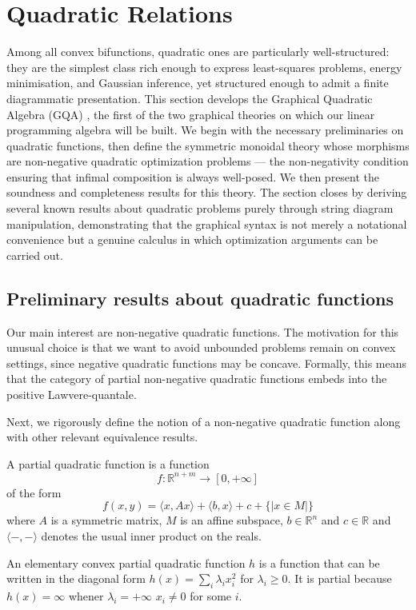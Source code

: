 \chapter{Quadratic Relations}

Among all convex bifunctions, quadratic ones are particularly well-structured:
they are the simplest class rich enough to express least-squares problems, energy minimisation, and Gaussian inference, yet structured enough to admit a finite diagrammatic presentation. This section develops the Graphical Quadratic Algebra (GQA) \cite{stein2024gqa}, the first of the two graphical theories on which our linear programming algebra will be built.
We begin with the necessary preliminaries on quadratic functions, then define the symmetric monoidal theory whose morphisms are non-negative quadratic optimization problems — the non-negativity condition ensuring that infimal composition is always well-posed. We then present the soundness and completeness results for this theory. The section closes by deriving several known results about quadratic problems purely through string diagram manipulation, demonstrating that the graphical syntax is not merely a notational convenience but a genuine calculus in which optimization arguments can be carried out.
\section{Preliminary results about quadratic functions}

Our main interest are non-negative quadratic functions. The motivation for this
unusual choice is that we want to avoid unbounded problems remain on convex settings, since negative quadratic functions
may be concave. Formally,
this means that the category of partial non-negative quadratic functions embeds into the positive
Lawvere-quantale.

Next, we rigorously define the notion of a non-negative quadratic function
along with other relevant equivalence results.

\begin{definition}
    A partial quadratic function is a function
\[
f : \mathbb{R}^{n+m} \to [0,+\infty]
\]
of the form
\[
f(x,y) = \langle x, Ax\rangle + \langle b, x\rangle + c +\{| x \in M|\}
\]
where $A$ is a symmetric matrix, $M$ is an affine subspace, $b \in \mathbb{R}^n$ and $c \in \mathbb{R}$ and $\langle-,-\rangle$ denotes the usual inner product on the reals.
\end{definition}

\begin{definition}
    An elementary convex partial quadratic function $h$ is a function that can be written in the diagonal form $h(x) = \sum_i \lambda_i x_i^2$ for $\lambda_i \ge 0$. It is partial because $h(x) = \infty$ whener $\lambda_i = +\infty$ $x_i \neq 0$ for some $i$.
\end{definition}

